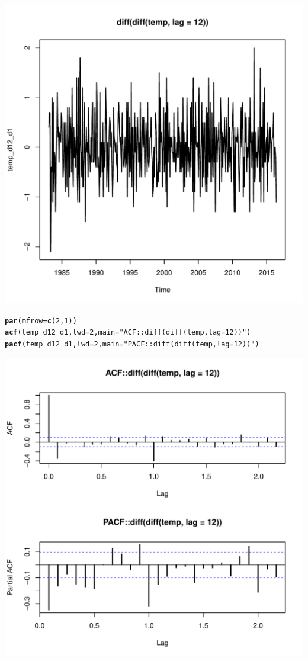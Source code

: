 \documentclass[10pt]{article}\usepackage[]{graphicx}\usepackage[]{color}
\makeatletter
\def\maxwidth{ %
  \ifdim\Gin@nat@width>\linewidth
    \linewidth
  \else
    \Gin@nat@width
  \fi
}
\newcommand{\hlnum}[1]{\textcolor[rgb]{0.686,0.059,0.569}{#1}}%
\newcommand{\hlstr}[1]{\textcolor[rgb]{0.192,0.494,0.8}{#1}}%
\newcommand{\hlstd}[1]{\textcolor[rgb]{0.345,0.345,0.345}{#1}}%
\newcommand{\hlkwc}[1]{\textcolor[rgb]{0.333,0.667,0.333}{#1}}%
\newcommand{\hlkwd}[1]{\textcolor[rgb]{0.737,0.353,0.396}{\textbf{#1}}}%
\newenvironment{kframe}{%
 \def\at@end@of@kframe{}%
 \ifinner\ifhmode%
  \def\at@end@of@kframe{\end{minipage}}%
  \begin{minipage}{\columnwidth}%
 \fi\fi%
 \def\FrameCommand##1{\hskip\@totalleftmargin \hskip-\fboxsep
 \colorbox{shadecolor}{##1}\hskip-\fboxsep
     \hskip-\linewidth \hskip-\@totalleftmargin \hskip\columnwidth}%
 \MakeFramed {\advance\hsize-\width
   \@totalleftmargin\z@ \linewidth\hsize
   \@setminipage}}%
 {\par\unskip\endMakeFramed%
 \at@end@of@kframe}
\newenvironment{knitrout}{}{} %
\makeatother
\begin{document}
\begin{knitrout}
\includegraphics[width=\maxwidth]{figure/unnamed-chunk-25-2} 
\begin{kframe}\begin{alltt}
\hlkwd{par}\hlstd{(}\hlkwc{mfrow}\hlstd{=}\hlkwd{c}\hlstd{(}\hlnum{2}\hlstd{,}\hlnum{1}\hlstd{))}
\hlkwd{acf}\hlstd{(temp_d12_d1,}\hlkwc{lwd} \hlstd{=} \hlnum{2}\hlstd{,} \hlkwc{main} \hlstd{=} \hlstr{"ACF::diff(diff(temp, lag = 12))"}\hlstd{)}
\hlkwd{pacf}\hlstd{(temp_d12_d1,}\hlkwc{lwd} \hlstd{=} \hlnum{2}\hlstd{,} \hlkwc{main} \hlstd{=} \hlstr{"PACF::diff(diff(temp, lag = 12))"}\hlstd{)}
\end{alltt}
\end{kframe}
\includegraphics[width=\maxwidth]{figure/unnamed-chunk-25-3} 

\end{knitrout}
\end{document}
